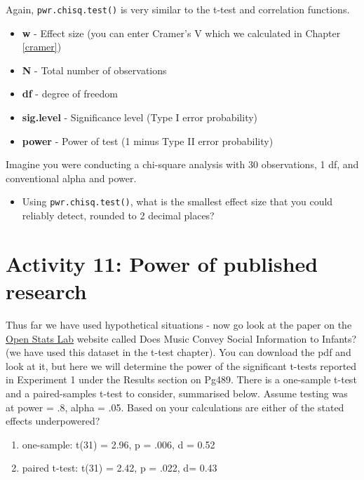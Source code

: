 \documentclass[]{book}
\providecommand{\tightlist}{%
  \setlength{\itemsep}{0pt}\setlength{\parskip}{0pt}}
\begin{document}
Again, \texttt{pwr.chisq.test()} is very similar to the t-test and correlation functions.

\begin{itemize}
\tightlist
\item
  \textbf{w} - Effect size (you can enter Cramer's V which we calculated in Chapter \ref{cramer})
\item
  \textbf{N } - Total number of observations
\item
  \textbf{df} - degree of freedom
\item
  \textbf{sig.level} - Significance level (Type I error probability)
\item
  \textbf{power} - Power of test (1 minus Type II error probability)
\end{itemize}

Imagine you were conducting a chi-square analysis with 30 observations, 1 df, and conventional alpha and power.

\begin{itemize}
\tightlist
\item
  Using \texttt{pwr.chisq.test()}, what is the smallest effect size that you could reliably detect, rounded to 2 decimal places? 
\end{itemize}

\hypertarget{activity-11-power-of-published-research}{%
\section{Activity 11: Power of published research}\label{activity-11-power-of-published-research}}

Thus far we have used hypothetical situations - now go look at the paper on the \href{https://sites.trinity.edu/osl/data-sets-and-activities/t-test-activities}{Open Stats Lab} website called Does Music Convey Social Information to Infants? (we have used this dataset in the t-test chapter). You can download the pdf and look at it, but here we will determine the power of the significant t-tests reported in Experiment 1 under the Results section on Pg489. There is a one-sample t-test and a paired-samples t-test to consider, summarised below. Assume testing was at power = .8, alpha = .05. Based on your calculations are either of the stated effects underpowered?

\begin{enumerate}
\def\labelenumi{\arabic{enumi}.}
\tightlist
\item
  one-sample: t(31) = 2.96, p = .006, d = 0.52
\item
  paired t-test: t(31) = 2.42, p = .022, d= 0.43
\end{enumerate}
\end{document}
